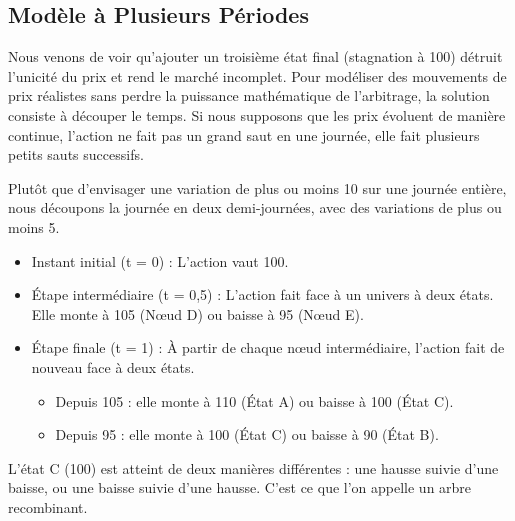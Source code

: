 \subsection{Modèle à Plusieurs Périodes}

Nous venons de voir qu'ajouter un troisième état final (stagnation à 100) détruit l'unicité du prix et rend le marché incomplet. Pour modéliser des mouvements de prix réalistes sans perdre la puissance mathématique de l'arbitrage, la solution consiste à découper le temps. Si nous supposons que les prix évoluent de manière continue, l'action ne fait pas un grand saut en une journée, elle fait plusieurs petits sauts successifs.



Plutôt que d'envisager une variation de plus ou moins 10 sur une journée entière, nous découpons la journée en deux demi-journées, avec des variations de plus ou moins 5.
\begin{itemize}[label=$\rightarrow$]
    \item Instant initial (t = 0) : L'action vaut 100.
    \item Étape intermédiaire (t = 0,5) : L'action fait face à un univers à deux états. Elle monte à 105 (Nœud D) ou baisse à 95 (Nœud E).
    \item Étape finale (t = 1) : À partir de chaque nœud intermédiaire, l'action fait de nouveau face à deux états.
    \begin{itemize}[label=$\cdot$]
        \item Depuis 105 : elle monte à 110 (État A) ou baisse à 100 (État C).
        \item Depuis 95 : elle monte à 100 (État C) ou baisse à 90 (État B).
    \end{itemize}
\end{itemize}
L'état C (100) est atteint de deux manières différentes : une hausse suivie d'une baisse, ou une baisse suivie d'une hausse. C'est ce que l'on appelle un arbre recombinant.

